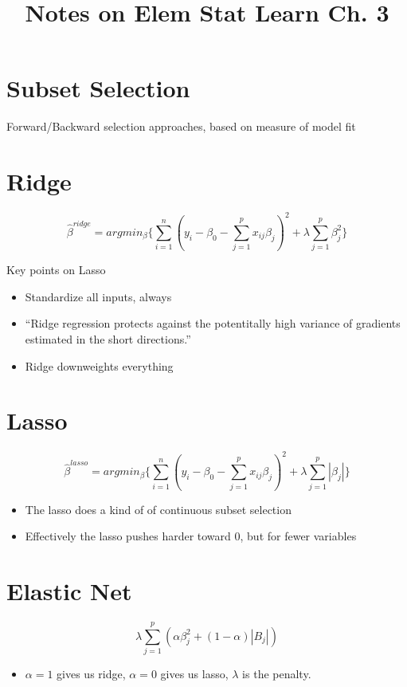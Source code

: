 \documentclass[12pt]{article}
\title{Notes on Elem Stat Learn Ch. 3}
\begin{document}
\maketitle

\section{Subset Selection}
\label{sec:suubset-selection}

Forward/Backward selection approaches, based on measure of model fit

\section{Ridge}
\label{sec:lasso}

\begin{equation}
  \label{eq:1}
\hat{\beta}^{ridge}=argmin_{\beta} \bigg \{\sum_{i=1}^{n}(y_i-\beta_0-\sum_{j=1}^{p}x_{ij}\beta_j)^2+\lambda\sum_{j=1}^p\beta^2_j \bigg \}
\end{equation}

Key points on Lasso

\begin{itemize}
\item Standardize all inputs, always

\item ``Ridge regression protects against the potentitally high variance of gradients estimated in the short directions.''

  
\item Ridge downweights everything
  
\end{itemize}

\section{Lasso}
\label{sec:ridge}


\begin{equation}
  \label{eq:1}  
  \hat{\beta}^{lasso}=argmin_{\beta} \bigg\{\sum_{i=1}^{n}(y_i-\beta_0-\sum_{j=1}^{p}x_{ij}\beta_j)^2+\lambda\sum_{j=1}^p |\beta_j| \bigg \}
\end{equation}


\begin{itemize}
\item The lasso does a kind of of continuous subset selection
\item Effectively the lasso pushes harder toward 0, but for fewer variables
  
\end{itemize}

\section{Elastic Net}
\label{sec:elastic-net}

\begin{equation}
\lambda \sum_{j=1}^p(\alpha\beta^2_j+(1-\alpha)|B_j|)
\end{equation}

\begin{itemize}
\item $\alpha=1$ gives us ridge, $\alpha=0$ gives us lasso, $\lambda$ is the penalty. 
\end{itemize}
\end{document}
